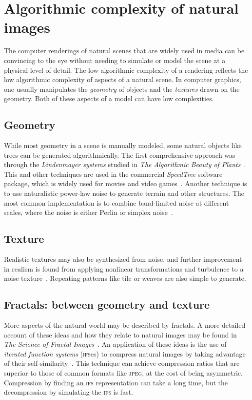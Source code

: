 \documentclass[aps,reprint,floatfix]{revtex4-2}
\theoremstyle{plain}
\theoremstyle{definition}
\begin{document}
\section{Algorithmic complexity of natural images}\label{sec:graphics}

The computer renderings of natural scenes that are widely used in media can be
convincing to the eye without needing to simulate or model the scene at a
physical level of detail. The low algorithmic complexity of a rendering
reflects the low algorithmic complexity of aspects of a natural scene. In
computer graphics, one usually manipulates the \emph{geometry} of objects and
the \emph{textures} drawn on the geometry. Both of these aspects of a model can
have low complexities.

\subsection{Geometry}

While most geometry in a scene is manually modeled, some natural objects like
trees can be generated algorithmically. The first comprehensive approach was
through the \emph{Lindenmayer systems} studied in \textit{The Algorithmic Beauty
of Plants}~\cite{lindenmayer}. This and other techniques are used in the
commercial \emph{SpeedTree} software package, which is widely used for movies
and video games~\cite{speedtree}. Another technique is to use naturalistic
power-law noise to generate terrain and other structures. The most common
implementation is to combine band-limited noise at different scales, where the
noise is either Perlin or simplex noise~\cite{perlin}.

\subsection{Texture}

Realistic textures may also be synthesized from noise, and further improvement
in realism is found from applying nonlinear transformations and turbulence to a
noise texture~\cite{perlin,hypertexture}. Repeating patterns like tile or
weaves are also simple to generate.

\subsection{Fractals: between geometry and texture}

More aspects of the natural world may be described by fractals. A more detailed
account of these ideas and how they relate to natural images may be found in
\textit{The Science of Fractal Images}~\cite{scifract}. An application of these
ideas is the use of \emph{iterated function systems} (\textsc{ifs}es) to
compress natural images by taking advantage of their
self-similarity~\cite[p.~228]{scifract}. This technique can achieve compression
ratios that are superior to those of common formats like \textsc{jpeg}, at the
cost of being asymmetric. Compression by finding an \textsc{ifs} representation
can take a long time, but the decompression by simulating the \textsc{ifs} is
fast.
\end{document}
